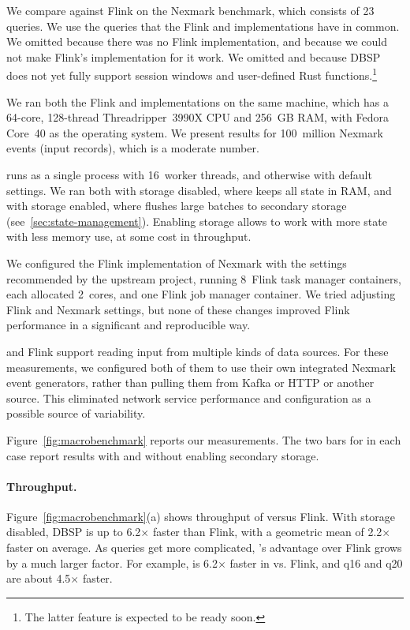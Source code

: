 We compare \dbsp against Flink on the Nexmark benchmark, which
consists of 23 queries.  We use the queries that the Flink and \dbsp
implementations have in common.  We omitted  because there
was no Flink implementation, and  because we could not make
Flink's implementation for it work.  We omitted  and
 because DBSP does not yet fully support session windows
and user-defined Rust functions.\footnote{The latter feature is
expected to be ready soon.}

We ran both the Flink and \dbsp implementations on the same machine,
which has a 64-core, 128-thread Threadripper~3990X CPU and 256~GB RAM,
with Fedora Core~40 as the operating system. We present results for
100~million Nexmark events (input records), which is a moderate
number.

\dbsp runs as a single process with 16~worker threads, and otherwise
with default settings.  We ran \dbsp both with storage disabled, where
\dbsp keeps all state in RAM, and with storage enabled, where \dbsp
flushes large batches to secondary storage
(see~\ref{sec:state-management}).  Enabling storage allows \dbsp to
work with more state with less memory use, at some cost in throughput.

We configured the Flink implementation of Nexmark with the settings
recommended by the upstream project, running 8~Flink task manager
containers, each allocated 2~cores, and one Flink job manager
container.  We tried adjusting Flink and Nexmark settings, but none of
these changes improved Flink performance in a significant and
reproducible way.

\dbsp and Flink support reading input from multiple kinds of data
sources.  For these measurements, we configured both of them to use
their own integrated Nexmark event generators, rather than pulling
them from Kafka or HTTP or another source.  This eliminated network
service performance and configuration as a possible source of
variability.

Figure~\ref{fig:macrobenchmark} reports our measurements.  The two
bars for \dbsp in each case report results with and without enabling
secondary storage.

\paragraph{Throughput.}

\newcommand{\x}{\(\times\)}

Figure~\ref{fig:macrobenchmark}(a) shows throughput of \dbsp versus
Flink.  With storage disabled, DBSP is up to 6.2\x{} faster than Flink, with a
geometric mean of 2.2\x{} faster on average.  As queries get more
complicated, \dbsp's advantage over Flink grows by a much larger
factor.  For example,  is 6.2\x{} faster in \dbsp vs. Flink,
and q16 and q20 are about 4.5\x{} faster.

